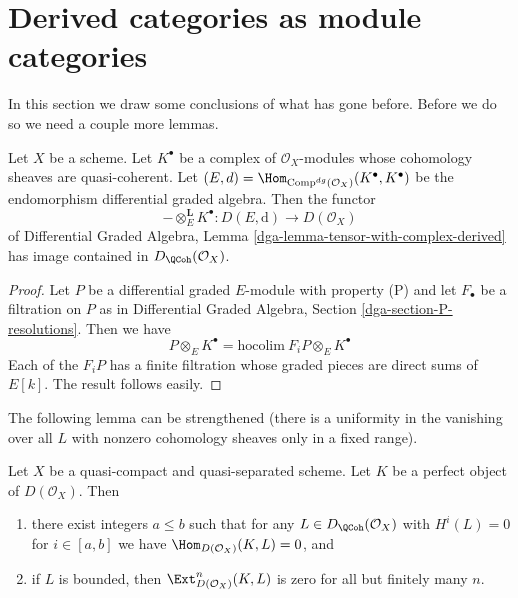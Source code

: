 \section{Derived categories as module categories}
\label{section-derived-is-dga}

\noindent
In this section we draw some conclusions of what has gone before.
Before we do so we need a couple more lemmas.

\begin{lemma}
\label{lemma-tensor-with-QCoh-complex}
Let $X$ be a scheme. Let $K^\bullet$ be a complex of $\mathcal{O}_X$-modules
whose cohomology sheaves are quasi-coherent. Let
$(E, d) = \Hom_{\text{Comp}^{dg}(\mathcal{O}_X)}(K^\bullet, K^\bullet)$
be the endomorphism differential graded algebra. Then the functor
$$
- \otimes_E^\mathbf{L} K^\bullet :
D(E, \text{d}) \longrightarrow D(\mathcal{O}_X)
$$
of
Differential Graded Algebra, Lemma
\ref{dga-lemma-tensor-with-complex-derived}
has image contained in $D_\QCoh(\mathcal{O}_X)$.
\end{lemma}

\begin{proof}
Let $P$ be a differential graded $E$-module with property (P)
and let $F_\bullet$ be a filtration on $P$ as in
Differential Graded Algebra, Section \ref{dga-section-P-resolutions}.
Then we have
$$
P \otimes_E K^\bullet = \text{hocolim}\ F_iP \otimes_E K^\bullet
$$
Each of the $F_iP$ has a finite filtration whose graded pieces
are direct sums of $E[k]$. The result follows easily.
\end{proof}

\noindent
The following lemma can be strengthened (there is a uniformity
in the vanishing over all $L$ with nonzero cohomology sheaves
only in a fixed range).

\begin{lemma}
\label{lemma-ext-from-perfect-into-bounded-QCoh}
Let $X$ be a quasi-compact and quasi-separated scheme.
Let $K$ be a perfect object of $D(\mathcal{O}_X)$. Then
\begin{enumerate}
\item there exist integers $a \leq b$ such that for any
$L \in D_\QCoh(\mathcal{O}_X)$ with $H^i(L) = 0$ for $i \in [a, b]$
we have $\Hom_{D(\mathcal{O}_X)}(K, L) = 0$, and
\item if $L$ is bounded, then $\Ext^n_{D(\mathcal{O}_X)}(K, L)$
is zero for all but finitely many $n$.
\end{enumerate}
\end{lemma}

